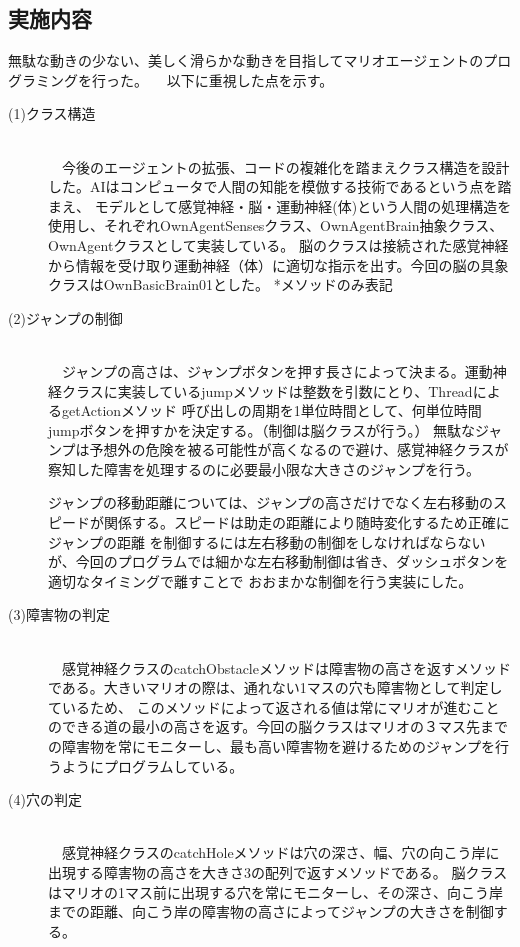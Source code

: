 \documentclass[a4j]{jarticle}
\begin{document}
\subsection{実施内容}
無駄な動きの少ない、美しく滑らかな動きを目指してマリオエージェントのプログラミングを行った。
　以下に重視した点を示す。
 \begin{description}
 
  \item[(1)クラス構造]~\\
　今後のエージェントの拡張、コードの複雑化を踏まえクラス構造を設計した。AIはコンピュータで人間の知能を模倣する技術であるという点を踏まえ、
  	モデルとして感覚神経・脳・運動神経(体)という人間の処理構造を使用し、それぞれOwnAgentSensesクラス、OwnAgentBrain抽象クラス、OwnAgentクラスとして実装している。
  	脳のクラスは接続された感覚神経から情報を受け取り運動神経（体）に適切な指示を出す。今回の脳の具象クラスはOwnBasicBrain01とした。
	*メソッドのみ表記
  \item[(2)ジャンプの制御] ~\\
　ジャンプの高さは、ジャンプボタンを押す長さによって決まる。運動神経クラスに実装しているjumpメソッドは整数を引数にとり、ThreadによるgetActionメソッド
	呼び出しの周期を1単位時間として、何単位時間jumpボタンを押すかを決定する。（制御は脳クラスが行う。）
	無駄なジャンプは予想外の危険を被る可能性が高くなるので避け、感覚神経クラスが察知した障害を処理するのに必要最小限な大きさのジャンプを行う。
	
	ジャンプの移動距離については、ジャンプの高さだけでなく左右移動のスピードが関係する。スピードは助走の距離により随時変化するため正確にジャンプの距離
	を制御するには左右移動の制御をしなければならないが、今回のプログラムでは細かな左右移動制御は省き、ダッシュボタンを適切なタイミングで離すことで
	おおまかな制御を行う実装にした。
	
  \item[(3)障害物の判定]~\\
　感覚神経クラスのcatchObstacleメソッドは障害物の高さを返すメソッドである。大きいマリオの際は、通れない1マスの穴も障害物として判定しているため、
このメソッドによって返される値は常にマリオが進むことのできる道の最小の高さを返す。今回の脳クラスはマリオの３マス先までの障害物を常にモニターし、最も高い障害物を避けるためのジャンプを行うようにプログラムしている。
  	
  \item[(4)穴の判定]~\\
　感覚神経クラスのcatchHoleメソッドは穴の深さ、幅、穴の向こう岸に出現する障害物の高さを大きさ3の配列で返すメソッドである。
脳クラスはマリオの1マス前に出現する穴を常にモニターし、その深さ、向こう岸までの距離、向こう岸の障害物の高さによってジャンプの大きさを制御する。
 \end{description}
\end{document}
